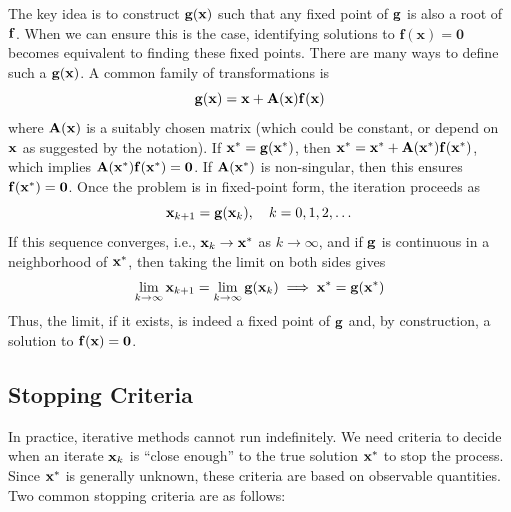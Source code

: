 The key idea is to construct $\mathbf{g}(\mathbf{x})$ such that any fixed point of $\mathbf{g}$ is also a root of $\mathbf{f}$. When we can ensure this is the case, identifying solutions to $\mathbf f(\mathbf x) = \mathbf 0$ becomes equivalent to finding these fixed points. There are many ways to define such a $\mathbf{g}(\mathbf{x})$. A common family of transformations is
\begin{equation}
    \mathbf{g}(\mathbf{x}) = \mathbf{x} + \mathbf{A}(\mathbf{x})\mathbf{f}(\mathbf{x})
\end{equation}
where $\mathbf{A}(\mathbf{x})$ is a suitably chosen matrix (which could be constant, or depend on $\mathbf{x}$ as suggested by the notation). If $\mathbf{x}^* = \mathbf{g}(\mathbf{x}^*)$, then $\mathbf{x}^* = \mathbf{x}^* + \mathbf{A}(\mathbf{x}^*)\mathbf{f}(\mathbf{x}^*)$, which implies $\mathbf{A}(\mathbf{x}^*)\mathbf{f}(\mathbf{x}^*) = \mathbf{0}$. If $\mathbf{A}(\mathbf{x}^*)$ is non-singular, then this ensures $\mathbf{f}(\mathbf{x}^*) = \mathbf{0}$. Once the problem is in fixed-point form, the iteration proceeds as
\begin{equation}
    \mathbf{x}_{k+1} = \mathbf{g}(\mathbf{x}_k), \quad k = 0, 1, 2, \dots
\end{equation}
If this sequence converges, i.e., $\mathbf{x}_k \to \mathbf{x}^*$ as $k \to \infty$, and if $\mathbf{g}$ is continuous in a neighborhood of $\mathbf{x}^*$, then taking the limit on both sides gives
\begin{equation} 
\lim_{k\to\infty} \mathbf{x}_{k+1} = \lim_{k\to\infty} \mathbf{g}(\mathbf{x}_k) \implies \mathbf{x}^* = \mathbf{g}(\mathbf{x}^*) 
\end{equation}
Thus, the limit, if it exists, is indeed a fixed point of $\mathbf{g}$ and, by construction, a solution to $\mathbf{f}(\mathbf{x}) = \mathbf{0}$.

\subsection{Stopping Criteria}
In practice, iterative methods cannot run indefinitely. We need criteria to decide when an iterate $\mathbf{x}_k$ is ``close enough'' to the true solution $\mathbf{x}^*$ to stop the process. Since $\mathbf{x}^*$ is generally unknown, these criteria are based on observable quantities. Two common stopping criteria are as follows:

